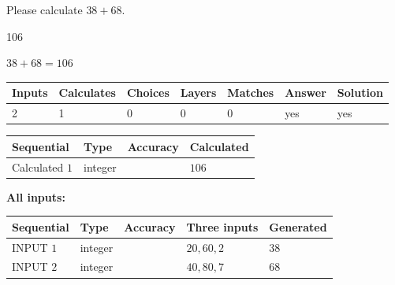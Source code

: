 \documentclass[12pt]{article}
\begin{document}
  
 
Please calculate $ %
38 +  %
68 $.
 
 
 
\noindent{}
 
 

106
 
 
\noindent{}
 
 

 
 
 
\noindent{}
 
 

$ %
38 +  %
68=   %
106$
 
 
\noindent{}
 
 

 
   
   
   
   
\noindent\begin{tabular}{|l|l|l|l|l|l|l|}
 \hline
Inputs & Calculates & Choices & Layers & Matches & Answer & Solution \\ \hline
 2  & 
 1  & 
 0
  & 
 0  & 
 0  & 
  yes & 
  yes 
  \\ \hline
 \end{tabular}
   
   
   
   
\noindent{}
   
   
  
  
\noindent\begin{tabular}{|l|l|l|l|}
\hline
 Sequential & Type & Accuracy & Calculated \\ 
\hline
 
 
  Calculated $  1 $ & integer &  & 
  $ 106 $ 
 \\  \hline  
 \end{tabular}
   
   
   
   
\noindent\vspace{0.1in}\hspace{-0.08in} {\textbf{\Large{All inputs: }}}
   
   
  
  
\noindent\begin{tabular}{|l|l|l|l|l|}
\hline
 Sequential & Type & Accuracy & Three inputs & Generated \\ 
\hline
 
 
  INPUT $  1 $ & integer &  & $
 20
 , 
 60
 , 
 2
 $ & $ 38 $ 
 \\  \hline  
 
 
  INPUT $  2 $ & integer &  & $
 40
 , 
 80
 , 
 7
 $ & $ 68 $ 
 \\  \hline  
 \end{tabular}
   
\end{document}
